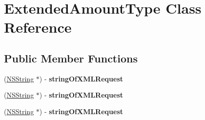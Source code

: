 \hypertarget{interface_extended_amount_type}{
\section{ExtendedAmountType Class Reference}
\label{interface_extended_amount_type}
}
\subsection*{Public Member Functions}
\begin{DoxyCompactItemize}
\item 
\hypertarget{interface_extended_amount_type_a28d5dc1f0976e6afaf7e4a27e9b38a9c}{
(\hyperlink{class_n_s_string}{NSString} $\ast$) -\/ {\bfseries stringOfXMLRequest}}
\label{interface_extended_amount_type_a28d5dc1f0976e6afaf7e4a27e9b38a9c}

\item 
\hypertarget{interface_extended_amount_type_a28d5dc1f0976e6afaf7e4a27e9b38a9c}{
(\hyperlink{class_n_s_string}{NSString} $\ast$) -\/ {\bfseries stringOfXMLRequest}}
\label{interface_extended_amount_type_a28d5dc1f0976e6afaf7e4a27e9b38a9c}

\item 
\hypertarget{interface_extended_amount_type_a28d5dc1f0976e6afaf7e4a27e9b38a9c}{
(\hyperlink{class_n_s_string}{NSString} $\ast$) -\/ {\bfseries stringOfXMLRequest}}
\label{interface_extended_amount_type_a28d5dc1f0976e6afaf7e4a27e9b38a9c}

\end{DoxyCompactItemize}
